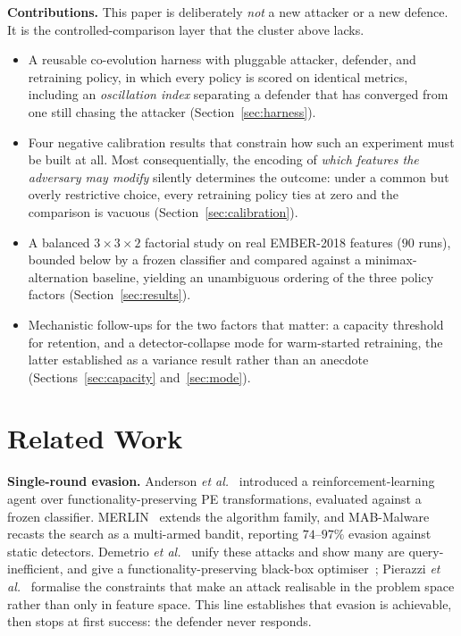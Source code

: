 \documentclass[conference]{IEEEtran}
\begin{document}
\textbf{Contributions.} This paper is deliberately \emph{not} a new attacker or
a new defence. It is the controlled-comparison layer that the cluster above
lacks.

\begin{itemize}
\item A reusable co-evolution harness with pluggable attacker, defender, and
retraining policy, in which every policy is scored on identical metrics,
including an \emph{oscillation index} separating a defender that has converged
from one still chasing the attacker (Section~\ref{sec:harness}).

\item Four negative calibration results that constrain how such an experiment
must be built at all. Most consequentially, the encoding of \emph{which
features the adversary may modify} silently determines the outcome: under a
common but overly restrictive choice, every retraining policy ties at zero and
the comparison is vacuous (Section~\ref{sec:calibration}).

\item A balanced $3\times3\times2$ factorial study on real EMBER-2018 features
($90$ runs), bounded below by a frozen classifier and compared against a
minimax-alternation baseline, yielding an unambiguous ordering of the three
policy factors (Section~\ref{sec:results}).

\item Mechanistic follow-ups for the two factors that matter: a capacity
threshold for retention, and a detector-collapse mode for warm-started
retraining, the latter established as a variance result rather than an anecdote
(Sections~\ref{sec:capacity} and~\ref{sec:mode}).
\end{itemize}

\section{Related Work}

\textbf{Single-round evasion.} Anderson \emph{et al.}~\cite{anderson2018rl}
introduced a reinforcement-learning agent over functionality-preserving PE
transformations, evaluated against a frozen classifier.
MERLIN~\cite{quertier2022merlin} extends the algorithm family, and
MAB-Malware~\cite{song2022mab} recasts the search as a multi-armed bandit,
reporting $74$--$97\%$ evasion against static detectors. Demetrio \emph{et
al.}~\cite{demetrio2021exemples} unify these attacks and show many are
query-inefficient, and give a functionality-preserving black-box
optimiser~\cite{demetrio2021tifs}; Pierazzi \emph{et
al.}~\cite{pierazzi2020problemspace} formalise the constraints that make an
attack realisable in the problem space rather than only in feature space. This
line establishes that evasion is achievable, then stops at first success: the
defender never responds.
\end{document}
